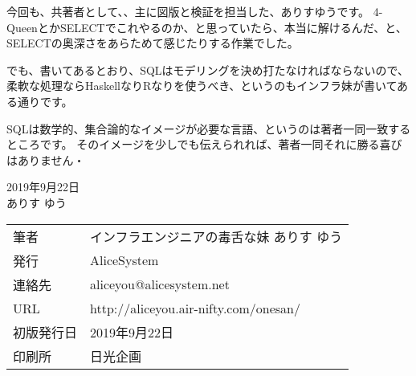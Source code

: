 今回も、共著者として、、主に図版と検証を担当した、ありすゆうです。
4-QueenとかSELECTでこれやるのか、と思っていたら、本当に解けるんだ、と、SELECTの奥深さをあらためて感じたりする作業でした。

でも、書いてあるとおり、SQLはモデリングを決め打たなければならないので、柔軟な処理ならHaskellなりRなりを使うべき、というのもインフラ妹が書いてある通りです。

SQLは数学的、集合論的なイメージが必要な言語、というのは著者一同一致するところです。
そのイメージを少しでも伝えられれば、著者一同それに勝る喜びはありません・

\begin{flushright}
2019年9月22日 \\
ありす ゆう
\end{flushright}



\thispagestyle{empty}
\mbox{}
\newpage
\clearpage

\mbox{}
\newpage
\clearpage



\vspace*{\fill}
\begin{tabular}{ll} \toprule
筆者 & インフラエンジニアの毒舌な妹 ありす ゆう\\
発行 & AliceSystem \\
連絡先 & aliceyou@alicesystem.net \\
URL & http://aliceyou.air-nifty.com/onesan/ \\
初版発行日 & 2019年9月22日 \\
印刷所 & 日光企画  \\ \bottomrule
\end{tabular}